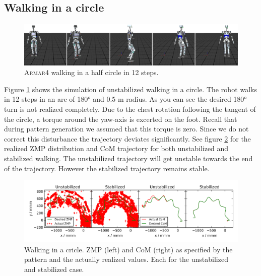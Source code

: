 \documentclass[english,ngerman]{KITreprt}
\newcommand{\name}[1]{\textsc{#1}}
\begin{document}
\subsection{Walking in a circle}\label{walking-in-a-circle}

\begin{figure}[hbt]
\vspace*{-1em}
\includegraphics[width=\textwidth,resolution=300]{images/undisturbed_circle_thumbs.png}
\caption{\name{Armar4} walking in a half circle in 12 steps.}
\label{img:player-undisturbed-circle-thumbs}
\end{figure}

Figure \ref{img:player-undisturbed-circle-thumbs} shows the simulation
of unstabilized walking in a circle. The robot walks in 12 steps in an
arc of 180° and 0.5 m radius. As you can see the desired 180° turn is
not realized completely. Due to the chest rotation following the tangent
of the circle, a torque around the yaw-axis is excerted on the foot.
Recall that during pattern generation we assumed that this torque is
zero. Since we do not correct this disturbance the trajectory deviates
significantly. See figure \ref{img:undisturbed-circle} for the realized
ZMP distribution and CoM trajectory for both unstabilized and stabilized
walking. The unstabilized trajectory will get unstable towards the end
of the trajectory. However the stabilized trajectory remains stable.

\begin{figure}[hbt]
\vspace*{-1em}
\includegraphics[width=\textwidth,resolution=300]{images/undisturbed_circle.png}
\caption{Walking in a cricle. ZMP (left) and CoM (right) as specified by the pattern and the actually realized values.
Each for the unstabilized and stabilized case.}
\label{img:undisturbed-circle}
\end{figure}
\end{document}

